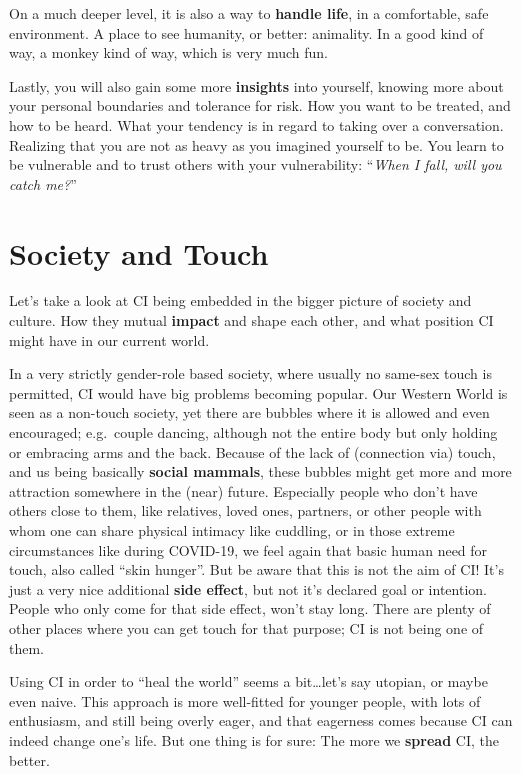 On a much deeper level, it is also a way to \textbf{handle life}, in a comfortable, safe environment.
A place to see humanity, or better: animality.
In a good kind of way, a monkey kind of way, which is very much fun.

Lastly, you will also gain some more \textbf{insights} into yourself, knowing more about your personal boundaries and tolerance for risk.
How you want to be treated, and how to be heard.
What your tendency is in regard to taking over a conversation.
Realizing that you are not as heavy as you imagined yourself to be.
You learn to be vulnerable and to trust others with your vulnerability: ``\textit{When I fall, will you catch me?}''

\section{Society and Touch}\label{sec:society-and-touch}

Let's take a look at CI being embedded in the bigger picture of society and culture.
How they mutual \textbf{impact} and shape each other, and what position CI might have in our current world.

In a very strictly gender-role based society, where usually no same-sex touch is permitted, CI would have big problems becoming popular.
Our Western World is seen as a non-touch society, yet there are bubbles where it is allowed and even encouraged; e.g.\ couple dancing, although not the entire body but only holding or embracing arms and the back.
Because of the lack of (connection via) touch, and us being basically \textbf{social mammals}, these bubbles might get more and more attraction somewhere in the (near) future.
Especially people who don't have others close to them, like relatives, loved ones, partners, or other people with whom one can share physical intimacy like cuddling, or in those extreme circumstances like during COVID-19, we feel again that basic human need for touch, also called ``skin hunger''.
But be aware that this is not the aim of CI!
It's just a very nice additional \textbf{side effect}, but not it's declared goal or intention.
People who only come for that side effect, won't stay long.
There are plenty of other places where you can get touch for that purpose; CI is not being one of them.

Using CI in order to ``heal the world'' seems a bit\ldots let's say utopian, or maybe even naive.
This approach is more well-fitted for younger people, with lots of enthusiasm, and still being overly eager, and that eagerness comes because CI can indeed change one's life.
But one thing is for sure: The more we \textbf{spread} CI, the better.

